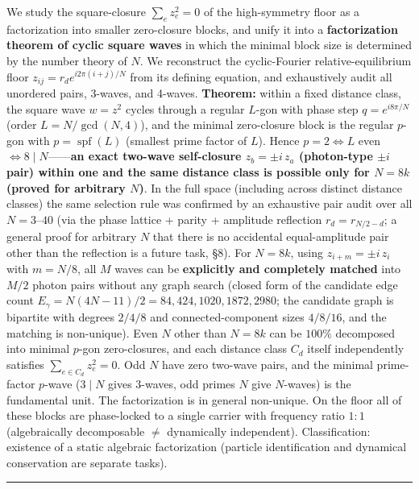 \documentclass[
  a4paper,
]{ltjsarticle}
\begin{document}
We study the square-closure \(\sum_e z_e^2=0\) of the high-symmetry
floor as a factorization into smaller zero-closure blocks, and unify it
into a \textbf{factorization theorem of cyclic square waves} in which
the minimal block size is determined by the number theory of \(N\). We
reconstruct the cyclic-Fourier relative-equilibrium floor
\(z_{ij}=r_d e^{i2\pi(i+j)/N}\) from its defining equation, and
exhaustively audit all unordered pairs, 3-waves, and 4-waves.
\textbf{Theorem:} within a fixed distance class, the square wave
\(w=z^2\) cycles through a regular \(L\)-gon with phase step
\(q=e^{i8\pi/N}\) (order \(L=N/\gcd(N,4)\)), and the minimal
zero-closure block is the regular \(p\)-gon with
\(p=\operatorname{spf}(L)\) (smallest prime factor of \(L\)). Hence
\(p=2\iff L\) even \(\iff 8\mid N\)------\textbf{an exact two-wave
self-closure \(z_b=\pm i\,z_a\) (photon-type \(\pm i\) pair) within one
and the same distance class is possible only for \(N=8k\) (proved for
arbitrary \(N\))}. In the full space (including across distinct distance
classes) the same selection rule was confirmed by an exhaustive pair
audit over all \(N=3\)--\(40\) (via the phase lattice + parity +
amplitude reflection \(r_d=r_{N/2-d}\); a general proof for arbitrary
\(N\) that there is no accidental equal-amplitude pair other than the
reflection is a future task, §8). For \(N=8k\), using
\(z_{i+m}=\pm i\,z_i\) with \(m=N/8\), all \(M\) waves can be
\textbf{explicitly and completely matched} into \(M/2\) photon pairs
without any graph search (closed form of the candidate edge count
\(E_\gamma=N(4N-11)/2=84,424,1020,1872,2980\); the candidate graph is
bipartite with degrees \(2/4/8\) and connected-component sizes
\(4/8/16\), and the matching is non-unique). Even \(N\) other than
\(N=8k\) can be \(100\%\) decomposed into minimal \(p\)-gon
zero-closures, and each distance class \(C_d\) itself independently
satisfies \(\sum_{e\in C_d}z_e^2=0\). Odd \(N\) have zero two-wave
pairs, and the minimal prime-factor \(p\)-wave (\(3\mid N\) gives
3-waves, odd primes \(N\) give \(N\)-waves) is the fundamental unit. The
factorization is in general non-unique. On the floor all of these blocks
are phase-locked to a single carrier with frequency ratio \(1{:}1\)
(algebraically decomposable \(\ne\) dynamically independent).
Classification: existence of a static algebraic factorization (particle
identification and dynamical conservation are separate tasks).

\begin{center}\rule{0.5\linewidth}{0.5pt}\end{center}
\end{document}
